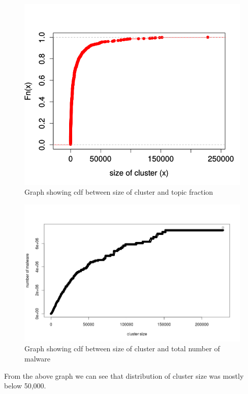 \begin{figure}[htbp]
\begin{center}
  \includegraphics[scale=0.5]{figures/ecdfclustersize.png}
\end{center}
\caption{Graph showing cdf between size of cluster and topic fraction}
\label{fig:ecdfclustersize}
\end{figure}
\begin{figure}[htbp]
\begin{center}
  \includegraphics[scale=0.3]{figures/cdfclusterlen2.png}
\end{center}
\caption{Graph showing cdf between size of cluster and total number of malware}
\label{fig:cdfclusterlen}
\end{figure}
From the above graph we can see that distribution of cluster size was mostly below 50,000.
